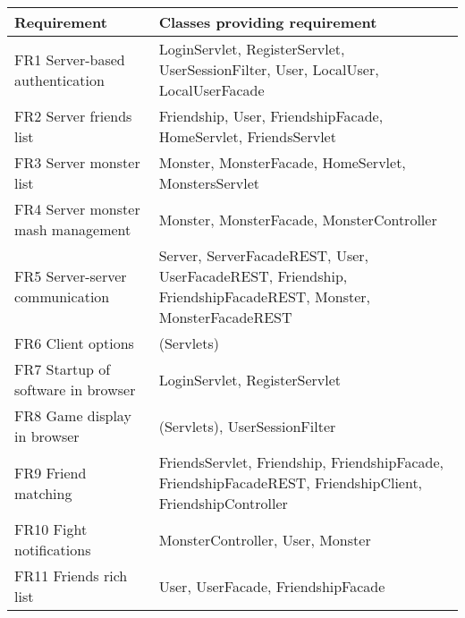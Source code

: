 \begin{tabular}{|p{5cm}|p{11cm}|}
\hline 
\textbf{Requirement} & \textbf{Classes providing requirement} \\ 
\hline 
FR1 Server-based authentication & LoginServlet, RegisterServlet, UserSessionFilter, User, LocalUser, LocalUserFacade \\ \hline 
FR2 Server friends list & Friendship, User, FriendshipFacade, HomeServlet, FriendsServlet \\ \hline 
FR3 Server monster list & Monster, MonsterFacade, HomeServlet, MonstersServlet \\ \hline 
FR4 Server monster mash management & Monster, MonsterFacade, MonsterController \\ \hline
FR5 Server-server communication & Server, ServerFacadeREST, User, UserFacadeREST, Friendship, FriendshipFacadeREST, Monster, MonsterFacadeREST \\ \hline 
FR6 Client options & (Servlets) \\ \hline  
FR7 Startup of software in browser & LoginServlet, RegisterServlet \\ \hline  
FR8 Game display in browser & (Servlets), UserSessionFilter \\ \hline  
FR9 Friend matching & FriendsServlet, Friendship, FriendshipFacade, FriendshipFacadeREST, FriendshipClient, FriendshipController \\ \hline  
FR10 Fight notifications &  MonsterController, User, Monster\\ \hline  
FR11 Friends rich list &  User, UserFacade, FriendshipFacade\\ \hline  

\end{tabular} 
